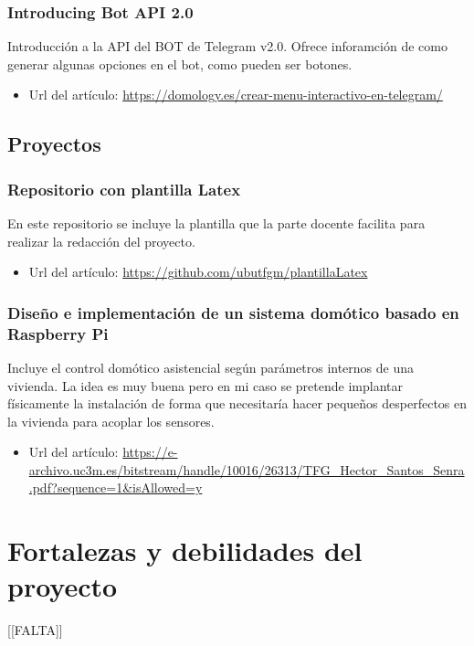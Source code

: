 \subsubsection{Introducing Bot API 2.0}
Introducción a la API del BOT de Telegram v2.0. Ofrece inforamción de como generar algunas opciones en el bot, como pueden ser botones.
\begin{itemize}
    \item Url del artículo: \url{https://domology.es/crear-menu-interactivo-en-telegram/}
\end{itemize}


\subsection{Proyectos}

\subsubsection{Repositorio con plantilla Latex}
En este repositorio se incluye la plantilla que la parte docente facilita para realizar la redacción del proyecto.
\begin{itemize}
    \item Url del artículo: \url{https://github.com/ubutfgm/plantillaLatex}
\end{itemize}

\subsubsection{Diseño e implementación de un sistema domótico basado en Raspberry Pi}
Incluye el control domótico asistencial según parámetros internos de una vivienda. La idea es muy buena pero en mi caso se pretende implantar físicamente la instalación de forma que necesitaría hacer pequeños desperfectos en la vivienda para acoplar los sensores.
\begin{itemize}
    \item Url del artículo: \url{https://e-archivo.uc3m.es/bitstream/handle/10016/26313/TFG_Hector_Santos_Senra.pdf?sequence=1&isAllowed=y}
\end{itemize}

\section{Fortalezas y debilidades del proyecto}


[[FALTA]]


